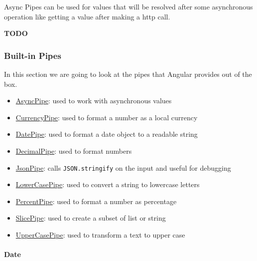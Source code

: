 \documentclass[12pt,]{article}
\providecommand{\tightlist}{%
  \setlength{\itemsep}{0pt}\setlength{\parskip}{0pt}}
\let\oldparagraph\paragraph
\renewcommand{\paragraph}[1]{\oldparagraph{#1}\mbox{}}
\begin{document}
Async Pipes can be used for values that will be resolved after some
asynchronous operation like getting a value after making a http call.

\textbf{TODO}

\subsubsection{Built-in Pipes}\label{built-in-pipes}

In this section we are going to look at the pipes that Angular provides
out of the box.

\begin{itemize}
\tightlist
\item
  \href{https://angular.io/docs/ts/latest/api/common/AsyncPipe-class.html}{AsyncPipe}:
  used to work with asynchronous values
\item
  \href{https://angular.io/docs/ts/latest/api/common/CurrencyPipe-class.html}{CurrencyPipe}:
  used to format a number as a local currency
\item
  \href{https://angular.io/docs/ts/latest/api/common/DatePipe-class.html}{DatePipe}:
  used to format a date object to a readable string
\item
  \href{https://angular.io/docs/ts/latest/api/common/DecimalPipe-class.html}{DecimalPipe}:
  used to format numbers
\item
  \href{https://angular.io/docs/ts/latest/api/common/JsonPipe-class.html}{JsonPipe}:
  calls \texttt{JSON.stringify} on the input and useful for debugging
\item
  \href{https://angular.io/docs/ts/latest/api/common/LowerCasePipe-class.html}{LowerCasePipe}:
  used to convert a string to lowercase letters
\item
  \href{https://angular.io/docs/ts/latest/api/common/PercentPipe-class.html}{PercentPipe}:
  used to format a number as percentage
\item
  \href{https://angular.io/docs/ts/latest/api/common/SlicePipe-class.html}{SlicePipe}:
  used to create a subset of list or string
\item
  \href{https://angular.io/docs/ts/latest/api/common/UpperCasePipe-class.html}{UpperCasePipe}:
  used to transform a text to upper case
\end{itemize}

\paragraph{Date}\label{date}
\end{document}
